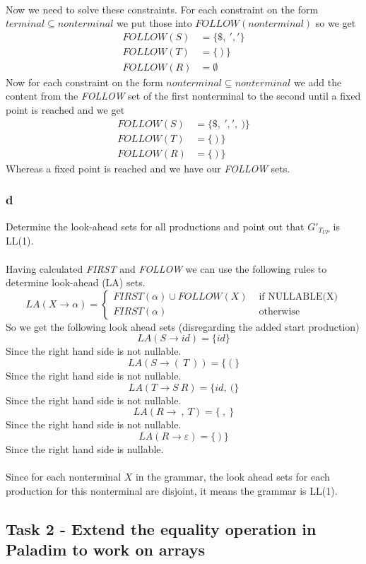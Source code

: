 \documentclass[12pt]{article}
\begin{document}
\\
Now we need to solve these constraints. For each constraint on the form $terminal \subseteq nonterminal$ we put those into $FOLLOW(nonterminal)$ so we get
\begin{align*}
FOLLOW(S) &= \{\$,\:','\} \\ 
FOLLOW(T) &= \{\:)\:\} \\
FOLLOW(R) &= \emptyset
\end{align*}
Now for each constraint on the form $nonterminal \subseteq nonterminal$ we add the content from the \textit{FOLLOW} set of the first nonterminal to the second until a fixed point is reached and we get
\begin{align*}
FOLLOW(S) &= \{\$,\:',',\:)\} \\
FOLLOW(T) &= \{\:)\:\} \\
FOLLOW(R) &= \{\:)\:\}
\end{align*}
Whereas a fixed point is reached and we have our \textit{FOLLOW} sets.

\subsubsection*{d}
Determine the look-ahead sets for all productions and point out that $G'_{T_{UP}}$ is LL(1).\\
\\
Having calculated \textit{FIRST} and \textit{FOLLOW} we can use the following rules to determine look-ahead (LA) sets.
$$
LA(X\rightarrow \alpha) = \left\{ \begin{array}{rl}
FIRST(\alpha) \cup FOLLOW(X) &\mbox{ if NULLABLE(X)} \\
FIRST(\alpha) &\mbox{ otherwise}
\end{array} \right.
$$
So we get the following look ahead sets (disregarding the added start production) \\
$$LA(S \rightarrow id) = \{id\}$$
Since the right hand side is not nullable.
$$LA(S \rightarrow (\:T\:)) = \{\:(\:\}$$
Since the right hand side is not nullable.
$$LA(T \rightarrow S\:R) = \{id,\:(\}$$
Since the right hand side is not nullable.
$$LA(R \rightarrow \:,\:T) = \{\:,\:\}$$
Since the right hand side is not nullable.
$$LA(R \rightarrow \varepsilon) = \{\:)\:\}$$
Since the right hand side is nullable.\\
\\
Since for each nonterminal $X$ in the grammar, the look ahead sets for each production for this nonterminal are disjoint, it means the grammar is LL(1).

\newpage

\subsection*{Task 2 - Extend the equality operation in Paladim to work on arrays}
\end{document}
